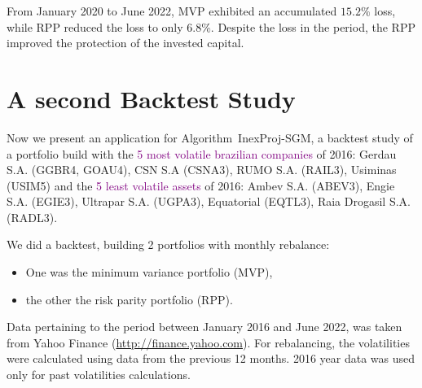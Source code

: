 From January 2020 to June 2022, MVP exhibited an accumulated $15.2\%$ loss, while RPP reduced the loss to only $6.8\%$. Despite the loss in the period, the RPP improved the protection of the invested capital.



\section{A second Backtest Study}

Now we present an application for Algorithm~InexProj-SGM, a backtest study of a portfolio build with the \textcolor{purple}{5 most volatile brazilian companies} of 2016: Gerdau S.A. (GGBR4, GOAU4), CSN S.A (CSNA3), RUMO S.A. (RAIL3), Usiminas (USIM5) and the \textcolor{purple}{5 least volatile assets} of 2016: Ambev S.A. (ABEV3), Engie S.A. (EGIE3), Ultrapar S.A. (UGPA3), Equatorial (EQTL3), Raia Drogasil S.A. (RADL3).

We did a backtest, building 2 portfolios with monthly rebalance:
\begin{itemize}
	\item One was the minimum variance portfolio (MVP),
	\item the other the risk parity portfolio (RPP).
\end{itemize}

Data pertaining to the period between January 2016  and June 2022, was taken from Yahoo Finance (\url{http://finance.yahoo.com}). For rebalancing, the volatilities were calculated using data from the previous 12 months. 2016 year data was used only for past volatilities calculations.


